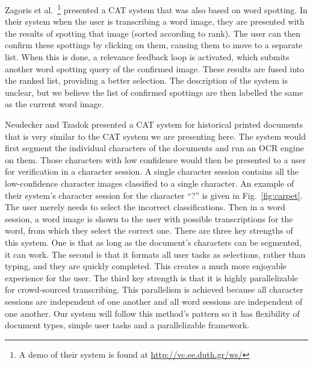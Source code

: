 \documentclass[ms]{byuprop}
\begin{document}
Zagoris et al.~\cite{Zagoris2015}\footnote{A demo of their system is found at \url{http://vc.ee.duth.gr/ws/}} presented a CAT system that was also based on word spotting. In their system when the user is transcribing a word image, they are presented with the results of spotting that image (sorted according to rank). The user can then confirm these spottings by clicking on them, causing them to move to a separate list. When this is done, a relevance feedback loop is activated, which submits another word spotting query of the confirmed image. These results are fused into the ranked list, providing a better selection. The description of the system is unclear, but we believe the list of confirmed spottings are then labelled the same as the current word image.

Neudecker and Tzadok \cite{Neudecker2010} presented a CAT system for historical printed documents that is very similar to the CAT system we are presenting here. The system would first segment the individual characters of the documents and run an OCR engine on them. Those characters with low confidence would then be presented to a user for verification in a character session. A single character session contains all the low-confidence character images classified to a single character. An example of their system's character session for the character ``?'' is given in Fig.~\ref{fig:carpet}.  The user merely needs to select the incorrect classifications. Then in a word session, a word image is shown to the user with possible transcriptions for the word, from which they select the correct one. There are three key strengths of this system. One is that as long as the document’s characters can be segmented, it can work. The second is that it formats all user tasks as selections, rather than typing, and they are quickly completed. This creates a much more enjoyable experience for the user. The third key strength is that it is highly parallelizable for crowd-sourced transcribing. This parallelism is achieved because all character sessions are independent of one another and all word sessions are independent of one another. Our system will follow this method's pattern so it has flexibility of document types, simple user tasks and a parallelizable framework.
\end{document}
